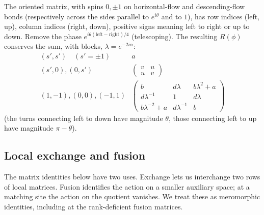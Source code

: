 The oriented matrix, with spins $0,\pm1$ on horizontal-flow and descending-flow bonds (respectively across the sides parallel to $e^{i\theta}$ and to $1$), has row indices (left, up), column indices (right, down), positive signs meaning left to right or up to down. Remove the phase $e^{i\theta(\text{left}-\text{right})/4}$ (telescoping). The resulting $R(\phi)$ conserves the sum, with blocks, $\lambda=e^{-2i\alpha}$:
\[
\begin{array}{c|c}
(s',s')\quad(s'=\pm1)& a\\
(s',0),(0,s')&\begin{pmatrix}v&u\\u&v\end{pmatrix}\\
(1,-1),(0,0),(-1,1)&
\begin{pmatrix}
 b&d\lambda& b\lambda^2+a\\
 d\lambda^{-1}&1&d\lambda\\
 b\lambda^{-2}+a&d\lambda^{-1}&b
\end{pmatrix}
\end{array}
\]
(the turns connecting left to down have magnitude $\theta$, those connecting left to up have magnitude $\pi-\theta$).

\subsection{Local exchange and fusion}

The matrix identities below have two uses. Exchange lets us interchange
two rows of local matrices. Fusion identifies the action on a smaller auxiliary
space; at a matching site the action on the quotient vanishes. We treat
these as meromorphic identities, including at the rank-deficient fusion
matrices.


